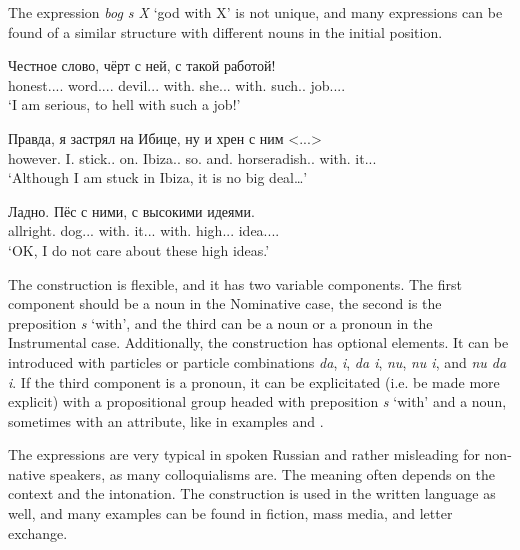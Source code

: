 \documentclass[output=paper]{langscibook}
\begin{document}
The expression \textit{bog s X} ‘god with X’ is not unique, and many expressions can be found of a similar structure with different nouns in the initial position.


\ea\label{ex:mikhailov:4}
\ea\label{ex:mikhailov:4a}
\gll  Честное слово, чёрт с ней, с такой работой!\\
     honest.{\ADJ}.{\NEUT}.{\NOM}.{\SG} word.{\NOUN}.{\NEUT}.{\NOM}.{\SG} devil.{\NOUN}{\glossM}.{\NOM}.{\SG} with.{\PREP} she.{\PRON}{\F}.{\INSTR}.{\SG} with.{\PREP} such.{\PRON}.{\INSTR} job.{\NOUN}.{\F}.{\INSTR}.{\SG}\\
\glt `I am serious, to hell with such a job!'

\ex
\gll Правда, я застрял на Ибице, ну и хрен с ним <...>\\
     however.{\ADV} \textsc{I.{\PRON}} stick.{\PAST}.{\glossM}{\SG} on.{\PREP} Ibiza.{\NOUNPROPER}.{\LOC} so.{\PTCP} and.{\PTCP} horseradish.{\NOUN}.{\NOM} with.{\PREP} it.{\PRON}.{\INSTR}.{\SG}\\
\glt `Although I am stuck in Ibiza, it is no big deal…'

\ex\label{ex:mikhailov:4c}
\gll Ладно. Пёс с ними, с высокими идеями.\\
     allright.{\ADV} dog.{\NOUN}{\glossM}.{\NOM}.{\SG} with.{\PREP} it.{\PRON}.{\PL}.{\INSTR} with.{\PREP} high.{\ADJ}.{\PL}.{\INSTR} idea.{\NOUN}.{\F}.{\PL}.{\INSTR}\\
\glt `OK, I do not care about these high ideas.'
\z
\z

The construction is flexible, and it has two variable components. The first component should be a noun in the Nominative case, the second is the preposition \textit{s} ‘with’, and the third can be a noun or a pronoun in the Instrumental case. Additionally, the construction has optional elements. It can be introduced with particles or particle combinations \textit{da}, \textit{i}, \textit{da i}, \textit{nu}, \textit{nu i}, and \textit{nu da i}. If the third component is a pronoun, it can be explicitated (i.e. be made more explicit) with a propositional group headed with preposition \textit{s} ‘with’ and a noun, sometimes with an attribute, like in examples  and .

The expressions are very typical in spoken Russian and rather misleading for non-native speakers, as many colloquialisms are. The meaning often depends on the context and the intonation. The construction is used in the written language as well, and many examples can be found in fiction, mass media, and letter exchange.
\end{document}
